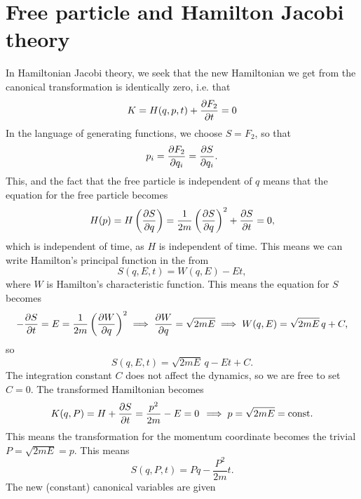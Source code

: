 \documentclass{article}
\begin{document}
    \section{Free particle and Hamilton Jacobi theory}
    In Hamiltonian Jacobi theory, we seek that the new Hamiltonian we get from the canonical transformation is identically zero, i.e. that
    \begin{equation*}
        K = H(q, p, t) + \pdv{F_2}{t} = 0
    \end{equation*} 
    In the language of generating functions, we choose $S = F_2$, so that
    \begin{equation*}
        p_i = \pdv{F_2}{q_i} = \pdv{S}{q_i}. 
    \end{equation*}
    This, and the fact that the free particle is independent of $q$ means that the equation for the free particle becomes
    \begin{equation*}
        H(p) = H\left(\pdv{S}{q}\right) = \frac{1}{2m} \left(\pdv{S}{q}\right)^2 + \pdv{S}{t} = 0,
    \end{equation*}
    which is independent of time, as $H$ is independent of time. This means we can write Hamilton's principal function in the from
    \begin{equation*}
        S(q, E, t) = W(q, E) - Et,
    \end{equation*}
    where $W$ is Hamilton's characteristic function. This means the equation for $S$ becomes
    \begin{equation*}
        -\pdv{S}{t} = E = \frac{1}{2m} \left(\pdv{W}{q}\right)^2 \implies \pdv{W}{q} = \sqrt{2 m E} \implies W(q, E) = \sqrt{2mE} \, q + C,
    \end{equation*}
    so
    \begin{equation*}
        S(q, E, t) = \sqrt{2mE} \, q - Et + C.
    \end{equation*}
    The integration constant $C$ does not affect the dynamics, so we are free to set $C=0$. The transformed Hamiltonian becomes
    \begin{equation*}
        K(q, P) = H + \pdv{S}{t} = \frac{p^2}{2m} - E = 0 \, \implies p = \sqrt{2mE} = \mathrm{const.}
    \end{equation*}
    This means the transformation for the momentum coordinate becomes the trivial $P = \sqrt{2mE} = p$. This means
    \begin{equation*}
        S(q, P, t) = P q - \frac{P^2}{2m} t.
    \end{equation*}
    The new (constant) canonical variables are given 
\end{document}
